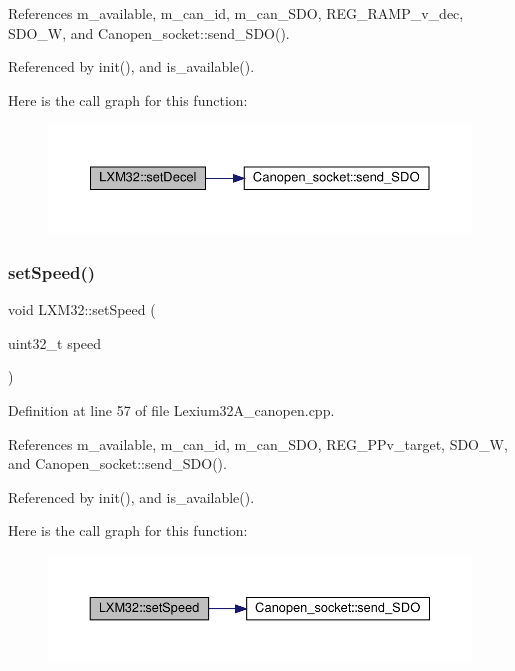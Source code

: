 References m\+\_\+available, m\+\_\+can\+\_\+id, m\+\_\+can\+\_\+\+S\+DO, R\+E\+G\+\_\+\+R\+A\+M\+P\+\_\+v\+\_\+dec, S\+D\+O\+\_\+W, and Canopen\+\_\+socket\+::send\+\_\+\+S\+D\+O().



Referenced by init(), and is\+\_\+available().

Here is the call graph for this function\+:\nopagebreak
\begin{figure}[H]
\begin{center}
\leavevmode
\includegraphics[width=350pt]{class_l_x_m32_aa1b975678f618dd2383e61bef655a353_cgraph}
\end{center}
\end{figure}
\mbox{\label{class_l_x_m32_aefb41cdca05c78cf0df485df8abbaf69}} 
\subsubsection{\texorpdfstring{set\+Speed()}{setSpeed()}}
{\footnotesize\ttfamily void L\+X\+M32\+::set\+Speed (\begin{DoxyParamCaption}\item[{uint32\+\_\+t}]{speed }\end{DoxyParamCaption})}



Definition at line 57 of file Lexium32\+A\+\_\+canopen.\+cpp.



References m\+\_\+available, m\+\_\+can\+\_\+id, m\+\_\+can\+\_\+\+S\+DO, R\+E\+G\+\_\+\+P\+Pv\+\_\+target, S\+D\+O\+\_\+W, and Canopen\+\_\+socket\+::send\+\_\+\+S\+D\+O().



Referenced by init(), and is\+\_\+available().

Here is the call graph for this function\+:\nopagebreak
\begin{figure}[H]
\begin{center}
\leavevmode
\includegraphics[width=350pt]{class_l_x_m32_aefb41cdca05c78cf0df485df8abbaf69_cgraph}
\end{center}
\end{figure}
\mbox{\label{class_l_x_m32_ae15a405ad09357b6dd0296db5bbce92d}} 
